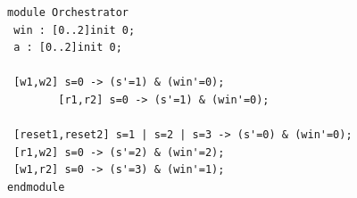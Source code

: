 \begin{example}


\begin{figure}[!htb]            
\begin{minipage}{9cm}
\begin{lstlisting}[style=framed,%customc,
	caption=PRISM Code for Read/Write of \fig{fig:even:odds},
 	label=exampleinprism]	
module Orchestrator
 win : [0..2]init 0;
 a : [0..2]init 0;
	
 [w1,w2] s=0 -> (s'=1) & (win'=0);
        [r1,r2] s=0 -> (s'=1) & (win'=0);

 [reset1,reset2] s=1 | s=2 | s=3 -> (s'=0) & (win'=0);
 [r1,w2] s=0 -> (s'=2) & (win'=2);
 [w1,r2] s=0 -> (s'=3) & (win'=1);
endmodule
\end{lstlisting}
 \end{minipage}  
\end{figure}

\end{example}